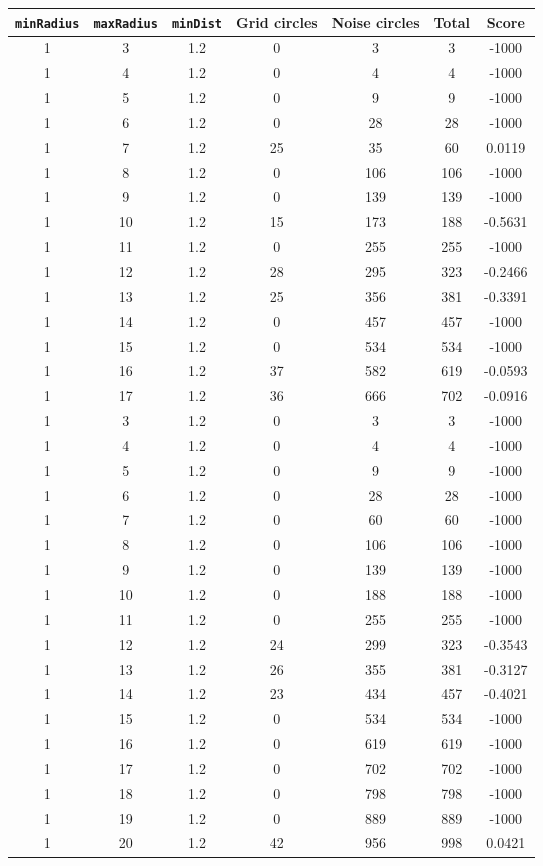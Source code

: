 \documentclass[letterpaper, 12pt]{article}
\begin{document}
\begin{longtable}{|c|c|c|c|c|c|c|}
\hline
\textbf{\texttt{minRadius}} & \textbf{\texttt{maxRadius}} & \textbf{\texttt{minDist}} & \textbf{Grid circles} & \textbf{Noise circles} & \textbf{Total} & \textbf{Score} \\
\hline
1 & 3 & 1.2 & 0 & 3 & 3 & -1000 \\
\hline
1 & 4 & 1.2 & 0 & 4 & 4 & -1000 \\
\hline
1 & 5 & 1.2 & 0 & 9 & 9 & -1000 \\
\hline
1 & 6 & 1.2 & 0 & 28 & 28 & -1000 \\
\hline
1 & 7 & 1.2 & 25 & 35 & 60 & 0.0119 \\
\hline
1 & 8 & 1.2 & 0 & 106 & 106 & -1000 \\
\hline
1 & 9 & 1.2 & 0 & 139 & 139 & -1000 \\
\hline
1 & 10 & 1.2 & 15 & 173 & 188 & -0.5631 \\
\hline
1 & 11 & 1.2 & 0 & 255 & 255 & -1000 \\
\hline
1 & 12 & 1.2 & 28 & 295 & 323 & -0.2466 \\
\hline
1 & 13 & 1.2 & 25 & 356 & 381 & -0.3391 \\
\hline
1 & 14 & 1.2 & 0 & 457 & 457 & -1000 \\
\hline
1 & 15 & 1.2 & 0 & 534 & 534 & -1000 \\
\hline
1 & 16 & 1.2 & 37 & 582 & 619 & -0.0593 \\
\hline
1 & 17 & 1.2 & 36 & 666 & 702 & -0.0916 \\
\hline
1 & 3 & 1.2 & 0 & 3 & 3 & -1000 \\
\hline
1 & 4 & 1.2 & 0 & 4 & 4 & -1000 \\
\hline
1 & 5 & 1.2 & 0 & 9 & 9 & -1000 \\
\hline
1 & 6 & 1.2 & 0 & 28 & 28 & -1000 \\
\hline
1 & 7 & 1.2 & 0 & 60 & 60 & -1000 \\
\hline
1 & 8 & 1.2 & 0 & 106 & 106 & -1000 \\
\hline
1 & 9 & 1.2 & 0 & 139 & 139 & -1000 \\
\hline
1 & 10 & 1.2 & 0 & 188 & 188 & -1000 \\
\hline
1 & 11 & 1.2 & 0 & 255 & 255 & -1000 \\
\hline
1 & 12 & 1.2 & 24 & 299 & 323 & -0.3543 \\
\hline
1 & 13 & 1.2 & 26 & 355 & 381 & -0.3127 \\
\hline
1 & 14 & 1.2 & 23 & 434 & 457 & -0.4021 \\
\hline
1 & 15 & 1.2 & 0 & 534 & 534 & -1000 \\
\hline
1 & 16 & 1.2 & 0 & 619 & 619 & -1000 \\
\hline
1 & 17 & 1.2 & 0 & 702 & 702 & -1000 \\
\hline
1 & 18 & 1.2 & 0 & 798 & 798 & -1000 \\
\hline
1 & 19 & 1.2 & 0 & 889 & 889 & -1000 \\
\hline
1 & 20 & 1.2 & 42 & 956 & 998 & 0.0421 \\
\hline
\end{longtable}
\end{document}
